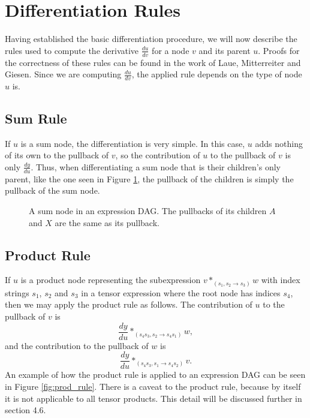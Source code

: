 \documentclass[12pt, a4paper]{report} %
\begin{document}
\section{Differentiation Rules}
Having established the basic differentiation procedure, we will now describe the rules used to compute the derivative $\frac{du}{dv}$ for a node $v$ and its parent $u$.
Proofs for the correctness of these rules can be found in the work \cite{tensorpaper} of Laue, Mitterreiter and Giesen.
Since we are computing $\frac{du}{dv}$, the applied rule depends on the type of node $u$ is.

\subsection{Sum Rule}
If $u$ is a sum node, the differentiation is very simple.
In this case, $u$ adds nothing of its own to the pullback of $v$, so the contribution of $u$ to the pullback of $v$ is only $\frac{dy}{du}$.
Thus, when differentiating a sum node that is their children's only parent, like the one seen in Figure \ref{fig:sum_rule}, the pullback of the children is simply the pullback of the sum node.

\begin{figure}
    \centering
    \caption[Example of Sum Rule Application]{A sum node in an expression DAG. The pullbacks of its children $A$ and $X$ are the same as its pullback.}
    \label{fig:sum_rule}
\end{figure}

\subsection{Product Rule}
If $u$ is a product node representing the subexpression $v *_{(s_1,s_2 \rightarrow s_3)} w$ with index strings $s_1$, $s_2$ and $s_3$ in a tensor expression where the root node has indices $s_4$, then we may apply the product rule as follows.
The contribution of $u$ to the pullback of $v$ is 
$$
\frac{dy}{du} *_{(s_4s_3,s_2 \rightarrow s_4s_1)} w,
$$
and the contribution to the pullback of $w$ is 
$$
\frac{dy}{du} *_{(s_4s_3,s_1 \rightarrow s_4s_2)} v.
$$
An example of how the product rule is applied to an expression DAG can be seen in Figure \ref{fig:prod_rule}.
There is a caveat to the product rule, because by itself it is not applicable to all tensor products.
This detail will be discussed further in section 4.6.
\end{document}
